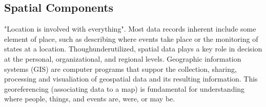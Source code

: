 \subsection{Spatial Components}

"Location is involved with everything"\cite{Bhattacharya2018}. %
Most data records inherent include some element of place, such as describing where events take place or the monitoring of states at a location. 
Thoughunderutilized, spatial data plays a key role in decision at the personal, organizational, and regional levels\cite{Bhattacharya2018}. %
Geographic information systems (GIS) are computer programs that suppor the collection, sharing, processing and visualiation of geospatial data and its resulting information\cite{McQueenBaker2019}. %
This georeferencing (associating data to a map) is fundamental for understanding where people, things, and events are, were, or may be\cite{Xing2015,Rajabifard2009}. %
